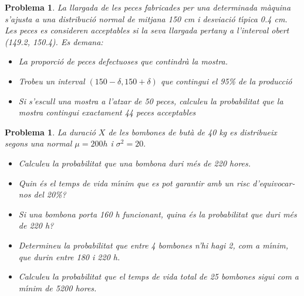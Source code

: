 \documentclass[11pt]{article}
\newcounter{prbcont}
\newtheorem{problema}[prbcont]{Problema}
\newcommand{\sol}[1]{{\textbf{\footnotetext[\the\problemes]{Sol.: #1} }}}
\begin{document}
\begin{problema}
La llargada de les peces fabricades per una determinada m\`aquina s'ajusta a una distribuci\'o normal de mitjana 150 cm i desviaci\'o t\'{\i}pica 0.4 cm. Les peces es consideren
acceptables si la seva llargada pertany a l'interval obert (149.2, 150.4). Es demana:
\begin{itemize}
\item [(a)] La proporci\'o de peces defectuoses que contindr\`a la mostra. %
\item [(b)] Trobeu un interval $(150-\delta, 150+\delta)$ que contingui el 95\% de la producci\'o
\item [(c)] Si s'escull una mostra a l'atzar de 50 peces, calculeu la probabilitat que la mostra
contingui exactament 44 peces acceptables %
\end{itemize}
\end{problema}


\begin{problema}
La duraci\'o $X$ de les bombones de but\`a de 40 kg es distribueix segons una normal $\mu =
200 h$ i $\sigma^2= 20.$
\begin{itemize}
\item [(a)] Calculeu la probabilitat que una bombona duri m\'es de 220 hores. %
\item [(b)] Quin \'es el temps de vida m\'{\i}nim que es pot garantir amb un risc d'equivocar-nos
del 20\%? %
\item [(c)] Si una bombona porta 160 h funcionant, quina \'es la probabilitat que duri m\'es
de 220 h? %
\item [(d)] Determineu la probabilitat que entre 4 bombones n'hi hagi 2, com a m\'{\i}nim, que
durin entre 180 i 220 h. %
\item [(e)] Calculeu la probabilitat que el temps de vida total de 25 bombones sigui com a
m\'{\i}nim de 5200 hores. %
\end{itemize}
\end{problema}
\end{document}
